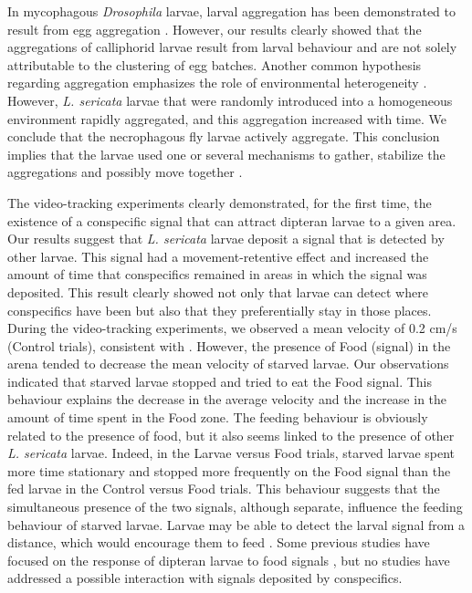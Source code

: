 In mycophagous \textit{Drosophila} larvae, larval aggregation has been demonstrated to result from egg aggregation \citep{jaenike_aggregation_1991}. However, our results clearly showed that the aggregations of calliphorid larvae result from larval behaviour and are not solely attributable to the clustering of egg batches. Another common hypothesis regarding aggregation emphasizes the role of environmental heterogeneity \citep{mailleux_collective_2011, devigne_individual_2011, broly_aggregation_2012}. However, \textit{L. sericata} larvae that were randomly introduced into a homogeneous environment rapidly aggregated, and this aggregation increased with time. We conclude that the necrophagous fly larvae actively aggregate. This conclusion implies that the larvae used one or several mechanisms to gather, stabilize the aggregations and possibly move together \citep{zirbes_new_2010, mailleux_collective_2011}.

The video-tracking experiments clearly demonstrated, for the first time, the existence of a conspecific signal that can attract dipteran larvae to a given area. Our results suggest that \textit{L. sericata} larvae deposit a signal that is detected by other larvae. This signal had a movement-retentive effect and increased the amount of time that conspecifics remained in areas in which the signal was deposited. This result clearly showed not only that larvae can detect where conspecifics have been but also that they preferentially stay in those places. During the video-tracking experiments, we observed a mean velocity of 0.2 cm/s (Control trials), consistent with \citet{charabidze_modelisation_2010}. However, the presence of Food (signal) in the arena tended to decrease the mean velocity of starved larvae. Our observations indicated that starved larvae stopped and tried to eat the Food signal. This behaviour explains the decrease in the average velocity and the increase in the amount of time spent in the Food zone. The feeding behaviour is obviously related to the presence of food, but it also seems linked to the presence of other \textit{L. sericata} larvae. Indeed, in the Larvae versus Food trials, starved larvae spent more time stationary and stopped more frequently on the Food signal than the fed larvae in the Control versus Food trials. This behaviour suggests that the simultaneous presence of the two signals, although separate, influence the feeding behaviour of starved larvae. Larvae may be able to detect the larval signal from a distance, which would encourage them to feed \citep{devigne_out_2004}. Some previous studies have focused on the response of dipteran larvae to food signals \citep{christopherson_foraging_1997, cobb_what_1999, kaiser_behaviour_2008}, but no studies have addressed a possible interaction with signals deposited by conspecifics.


